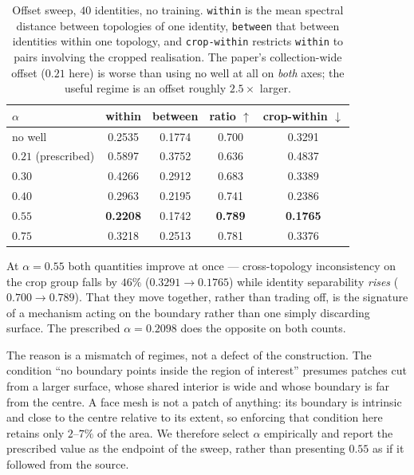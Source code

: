\documentclass{article}
\begin{document}
\begin{table}[!ht]
\centering
\caption{Offset sweep, $40$ identities, no training. \texttt{within} is the mean spectral
distance between topologies of one identity, \texttt{between} that between identities within
one topology, and \texttt{crop-within} restricts \texttt{within} to pairs involving the
cropped realisation. The paper's collection-wide offset ($0.21$ here) is worse than using no
well at all on \emph{both} axes; the useful regime is an offset roughly $2.5\times$ larger.}
\label{tab:supp_alpha_sweep}
\begin{tabular}{lcccc}
\toprule
$\alpha$ & within & between & ratio $\uparrow$ & crop-within $\downarrow$ \\
\midrule
no well            & 0.2535 & 0.1774 & 0.700 & 0.3291 \\
$0.21$ (prescribed)& 0.5897 & 0.3752 & 0.636 & 0.4837 \\
$0.30$             & 0.4266 & 0.2912 & 0.683 & 0.3389 \\
$0.40$             & 0.2963 & 0.2195 & 0.741 & 0.2386 \\
$\mathbf{0.55}$    & \textbf{0.2208} & 0.1742 & \textbf{0.789} & \textbf{0.1765} \\
$0.75$             & 0.3218 & 0.2513 & 0.781 & 0.3376 \\
\bottomrule
\end{tabular}
\end{table}

At $\alpha = 0.55$ both quantities improve at once --- cross-topology inconsistency on the crop
group falls by $46\%$ ($0.3291 \rightarrow 0.1765$) while identity separability \emph{rises}
($0.700 \rightarrow 0.789$). That they move together, rather than trading off, is the signature
of a mechanism acting on the boundary rather than one simply discarding surface. The prescribed
$\alpha = 0.2098$ does the opposite on both counts.

The reason is a mismatch of regimes, not a defect of the construction. The condition ``no
boundary points inside the region of interest'' presumes patches cut from a larger surface,
whose shared interior is wide and whose boundary is far from the centre. A face mesh is not a
patch of anything: its boundary is intrinsic and close to the centre relative to its extent, so
enforcing that condition here retains only $2$--$7\%$ of the area. We therefore select $\alpha$
empirically and report the prescribed value as the endpoint of the sweep, rather than presenting
$0.55$ as if it followed from the source.
\end{document}
